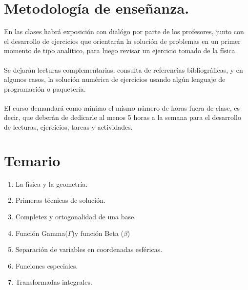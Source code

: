 \documentclass[12pt]{article}
\begin{document}
\section{Metodología de enseñanza.}
En las clases habrá exposición con dialógo por parte de los profesores, junto con el desarrollo de ejercicios que orientarán la solución de problemas en un primer momento de tipo analítico, para luego revisar un ejercicio tomado de la física.
\\
\\
Se dejarán lecturas complementarias, consulta de referencias bibliográficas, y en algunos casos, la solución numérica de ejercicios usando algún lenguaje de programación o paquetería.
\\
\\
El curso demandará como mínimo el mismo número de horas fuera de clase, es decir, que deberán de dedicarle al menos 5 horas a la semana para el desarrollo de lecturas, ejercicios, tareas y actividades.
\section{Temario}
\begin{enumerate}
\item La física y la geometría.
\item Primeras técnicas de solución.
\item Completez y ortogonalidad de una base.
\item Función Gamma($\Gamma$)y función Beta ($\beta$)
\item Separación de variables en coordenadas esféricas.
\item Funciones especiales.
\item Transformadas integrales.
\end{enumerate}
\end{document}
